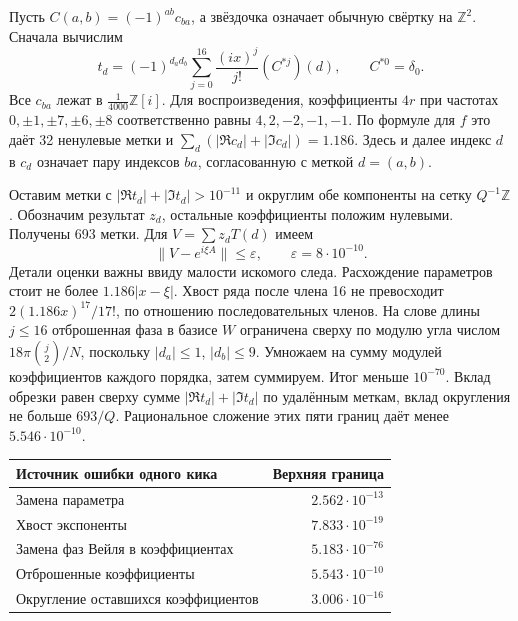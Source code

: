 \documentclass[11pt,a4paper]{article}
\newcommand{\Z}{\mathbb Z}
\newcommand{\eps}{\varepsilon}
\begin{document}
Пусть $C(a,b)=(-1)^{ab}c_{ba}$, а звёздочка означает обычную свёртку на $\Z^2$. Сначала вычислим
\[
 t_d=(-1)^{d_ad_b}\sum_{j=0}^{16}\frac{(ix)^j}{j!}(C^{*j})(d),
 \qquad C^{*0}=\delta_0 .                                                 \tag{6}
\]
Все $c_{ba}$ лежат в $\frac1{4000}\Z[i]$. Для воспроизведения, коэффициенты $4r$ при частотах $0,\pm1,\pm7,\pm6,\pm8$ соответственно равны $4,2,-2,-1,-1$. По формуле для $f$ это даёт 32 ненулевые метки и $\sum_d(|\Re c_d|+|\Im c_d|)=1.186$. Здесь и далее индекс $d$ в $c_d$ означает пару индексов $ba$, согласованную с меткой $d=(a,b)$.

Оставим метки с $|\Re t_d|+|\Im t_d|>10^{-11}$ и округлим обе компоненты на сетку $Q^{-1}\Z$. Обозначим результат $z_d$, остальные коэффициенты положим нулевыми. Получены 693 метки. Для $V=\sum z_dT(d)$ имеем
\[
 \|V-e^{i\xi A}\|\le\eps,\qquad \eps=8\cdot10^{-10}.                  \tag{7}
\]
Детали оценки важны ввиду малости искомого следа. Расхождение параметров стоит не более $1.186|x-\xi|$. Хвост ряда после члена 16 не превосходит $2(1.186 x)^{17}/17!$, по отношению последовательных членов. На слове длины $j\le16$ отброшенная фаза в базисе $W$ ограничена сверху по модулю угла числом $18\pi\binom j2/N$, поскольку $|d_a|\le1$, $|d_b|\le9$. Умножаем на сумму модулей коэффициентов каждого порядка, затем суммируем. Итог меньше $10^{-70}$. Вклад обрезки равен сверху сумме $|\Re t_d|+|\Im t_d|$ по удалённым меткам, вклад округления не больше $693/Q$. Рациональное сложение этих пяти границ даёт менее $5.546\cdot10^{-10}$.

\begin{center}\small
\begin{tabular}{@{}lr@{}}\toprule
Источник ошибки одного кика & Верхняя граница \\ \midrule
Замена параметра & $2.562\cdot10^{-13}$ \\
Хвост экспоненты & $7.833\cdot10^{-19}$ \\
Замена фаз Вейля в коэффициентах & $5.183\cdot10^{-76}$ \\
Отброшенные коэффициенты & $5.543\cdot10^{-10}$ \\
Округление оставшихся коэффициентов & $3.006\cdot10^{-16}$ \\ \bottomrule
\end{tabular}\end{center}
\end{document}
